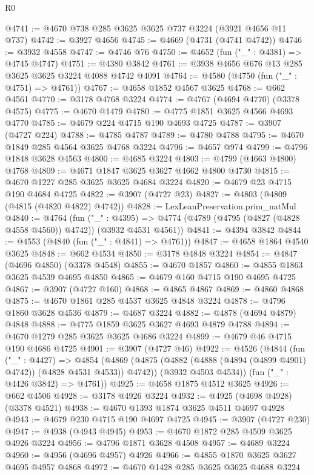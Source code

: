 \begin{lexlean}{R0}
\begin{coremodule}
@4741 := @4670 @738 @285 @3625 @3625 @737 @3224 (@3921 @4656 @11 @737)
@4742 := @3927 @4656
@4745 := @4669 (@4731 (@4741 @4742))
@4746 := @3932 @4558
@4747 := @4746 @76
@4750 := @4652 (fun ("_" : @4381) => @4745 @4747)
@4751 := @4380 @3842
@4761 := @3938 @4656 @676 @13 @285 @3625 @3625 @3224 @4088 @4742 @4091
@4764 := @4580 (@4750 (fun ("_" : @4751) => @4761))
@4767 := @4658 @1852 @4567 @3625
@4768 := @662 @4561
@4770 := @3178 @4768 @3224
@4774 := @4767 (@4694 @4770) (@3378 @4575)
@4775 := @4670 @1479
@4780 := @4775 @1851 @3625 @4566 @4693 @4770
@4785 := @4679 @224 @4715 @190 @4693 @4725
@4787 := @3907 (@4727 @224)
@4788 := @4785 @4787
@4789 := @4780 @4788
@4795 := @4670 @1849 @285 @4564 @3625 @4768 @3224
@4796 := @4657 @974
@4799 := @4796 @1848 @3628 @4563
@4800 := @4685 @3224
@4803 := @4799 (@4663 @4800) @4768
@4809 := @4671 @1847 @3625 @3627 @4662 @4800 @4730
@4815 := @4670 @1227 @285 @3625 @3625 @4684 @3224
@4820 := @4679 @23 @4715 @190 @4684 @4725
@4822 := @3907 (@4727 @23)
@4827 := @4803 (@4809 (@4815 (@4820 @4822) @4742))
@4828 := LexLeanPreservation.prim_natMul
@4840 := @4764
    (fun ("_" : @4395) =>
    @4774 (@4789 (@4795 (@4827 (@4828 @4558 @4560)) @4742)) (@3932 @4531 @4561))
@4841 := @4394 @3842
@4844 := @4553 (@4840 (fun ("_" : @4841) => @4761))
@4847 := @4658 @1864 @4540 @3625
@4848 := @662 @4534
@4850 := @3178 @4848 @3224
@4854 := @4847 (@4696 @4850) (@3378 @4548)
@4855 := @4670 @1857
@4860 := @4855 @1863 @3625 @4539 @4695 @4850
@4865 := @4679 @160 @4715 @190 @4695 @4725
@4867 := @3907 (@4727 @160)
@4868 := @4865 @4867
@4869 := @4860 @4868
@4875 := @4670 @1861 @285 @4537 @3625 @4848 @3224
@4878 := @4796 @1860 @3628 @4536
@4879 := @4687 @3224
@4882 := @4878 (@4694 @4879) @4848
@4888 := @4775 @1859 @3625 @3627 @4693 @4879 @4788
@4894 := @4670 @1279 @285 @3625 @3625 @4686 @3224
@4899 := @4679 @46 @4715 @190 @4686 @4725
@4901 := @3907 (@4727 @46)
@4922 := @4526
    (@4844
      (fun ("_" : @4427) =>
      @4854
        (@4869 (@4875 (@4882 (@4888 (@4894 (@4899 @4901) @4742)) (@4828 @4531 @4533)) @4742))
        (@3932 @4503 @4534))
      (fun ("_" : @4426 @3842) => @4761))
@4925 := @4658 @1875 @4512 @3625
@4926 := @662 @4506
@4928 := @3178 @4926 @3224
@4932 := @4925 (@4698 @4928) (@3378 @4521)
@4938 := @4670 @1393 @1874 @3625 @4511 @4697 @4928
@4943 := @4679 @230 @4715 @190 @4697 @4725
@4945 := @3907 (@4727 @230)
@4947 := @4938 (@4943 @4945)
@4953 := @4670 @1872 @285 @4509 @3625 @4926 @3224
@4956 := @4796 @1871 @3628 @4508
@4957 := @4689 @3224
@4960 := @4956 (@4696 @4957) @4926
@4966 := @4855 @1870 @3625 @3627 @4695 @4957 @4868
@4972 := @4670 @1428 @285 @3625 @3625 @4688 @3224

\end{coremodule}
\end{lexlean}
